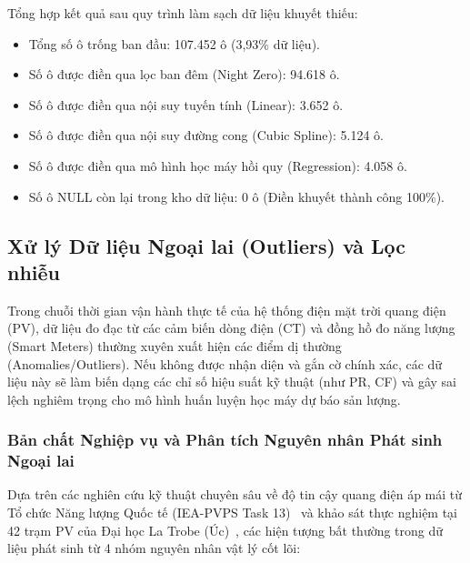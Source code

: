 \documentclass[12pt, a4paper]{report}
\begin{document}
Tổng hợp kết quả sau quy trình làm sạch dữ liệu khuyết thiếu:
\begin{itemize}
    \item Tổng số ô trống ban đầu: 107.452 ô (3,93\% dữ liệu).
    \item Số ô được điền qua lọc ban đêm (Night Zero): 94.618 ô.
    \item Số ô được điền qua nội suy tuyến tính (Linear): 3.652 ô.
    \item Số ô được điền qua nội suy đường cong (Cubic Spline): 5.124 ô.
    \item Số ô được điền qua mô hình học máy hồi quy (Regression): 4.058 ô.
    \item Số ô NULL còn lại trong kho dữ liệu: 0 ô (Điền khuyết thành công 100\%).
\end{itemize}

\subsection{Xử lý Dữ liệu Ngoại lai (Outliers) và Lọc nhiễu}
\label{subsec:outlier_processing}

Trong chuỗi thời gian vận hành thực tế của hệ thống điện mặt trời quang điện (PV), dữ liệu đo đạc từ các cảm biến dòng điện (CT) và đồng hồ đo năng lượng (Smart Meters) thường xuyên xuất hiện các điểm dị thường (Anomalies/Outliers). Nếu không được nhận diện và gắn cờ chính xác, các dữ liệu này sẽ làm biến dạng các chỉ số hiệu suất kỹ thuật (như PR, CF) và gây sai lệch nghiêm trọng cho mô hình huấn luyện học máy dự báo sản lượng.

\subsubsection{Bản chất Nghiệp vụ và Phân tích Nguyên nhân Phát sinh Ngoại lai}
Dựa trên các nghiên cứu kỹ thuật chuyên sâu về độ tin cậy quang điện áp mái từ Tổ chức Năng lượng Quốc tế (IEA-PVPS Task 13)~\cite{iea2023pvps} và khảo sát thực nghiệm tại 42 trạm PV của Đại học La Trobe (Úc)~\cite{wimalaratne2022unisolar}, các hiện tượng bất thường trong dữ liệu phát sinh từ 4 nhóm nguyên nhân vật lý cốt lõi:
\end{document}
